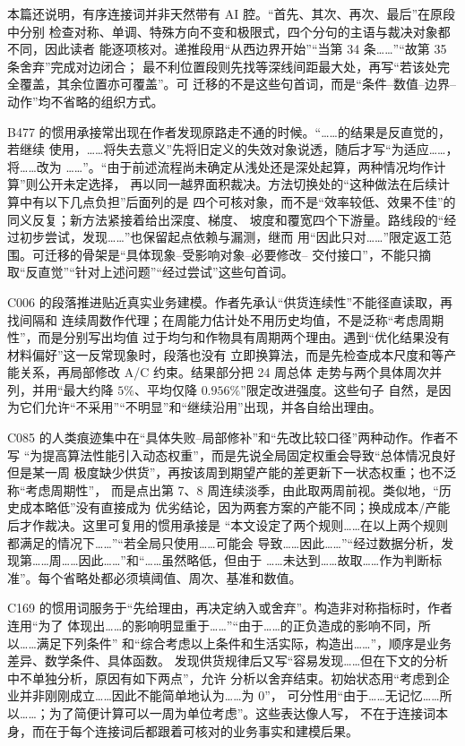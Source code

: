 本篇还说明，有序连接词并非天然带有 AI 腔。“首先、其次、再次、最后”在原段中分别
检查对称、单调、特殊方向不变和极限式，四个分句的主语与裁决对象都不同，因此读者
能逐项核对。递推段用“从西边界开始”“当第 34 条……”“故第 35 条舍弃”完成对边闭合；
最不利位置段则先找等深线间距最大处，再写“若该处完全覆盖，其余位置亦可覆盖”。可
迁移的不是这些句首词，而是“条件--数值--边界--动作”均不省略的组织方式。

B477 的惯用承接常出现在作者发现原路走不通的时候。“……的结果是反直觉的，若继续
使用，……将失去意义”先将旧定义的失效对象说透，随后才写“为适应……，将……改为
……”。“由于前述流程尚未确定从浅处还是深处起算，两种情况均作计算”则公开未定选择，
再以同一越界面积裁决。方法切换处的“这种做法在后续计算中有以下几点负担”后面列的是
四个可核对象，而不是“效率较低、效果不佳”的同义反复；新方法紧接着给出深度、梯度、
坡度和覆宽四个下游量。路线段的“经过初步尝试，发现……”也保留起点依赖与漏测，继而
用“因此只对……”限定返工范围。可迁移的骨架是“具体现象--受影响对象--必要修改--
交付接口”，不能只摘取“反直觉”“针对上述问题”“经过尝试”这些句首词。

C006 的段落推进贴近真实业务建模。作者先承认“供货连续性”不能径直读取，再找间隔和
连续周数作代理；在周能力估计处不用历史均值，不是泛称“考虑周期性”，而是分别写出均值
过于均匀和作物具有周期两个理由。遇到“优化结果没有材料偏好”这一反常现象时，段落也没有
立即换算法，而是先检查成本尺度和等产能关系，再局部修改 A/C 约束。结果部分把 24 周总体
走势与两个具体周次并列，并用“最大约降 $5\%$、平均仅降 $0.956\%$”限定改进强度。这些句子
自然，是因为它们允许“不采用”“不明显”和“继续沿用”出现，并各自给出理由。

C085 的人类痕迹集中在“具体失败--局部修补”和“先改比较口径”两种动作。作者不写
“为提高算法性能引入动态权重”，而是先说全局固定权重会导致“总体情况良好但是某一周
极度缺少供货”，再按该周到期望产能的差更新下一状态权重；也不泛称“考虑周期性”，
而是点出第 7、8 周连续淡季，由此取两周前视。类似地，“历史成本略低”没有直接成为
优劣结论，因为两套方案的产能不同；换成成本/产能后才作裁决。这里可复用的惯用承接是
“本文设定了两个规则……在以上两个规则都满足的情况下……”“若全局只使用……可能会
导致……因此……”“经过数据分析，发现第……周……因此……”和“……虽然略低，但由于
……未达到……故取……作为判断标准”。每个省略处都必须填阈值、周次、基准和数值。

C169 的惯用词服务于“先给理由，再决定纳入或舍弃”。构造非对称指标时，作者连用“为了
体现出……的影响明显重于……”“由于……的正负造成的影响不同，所以……满足下列条件”
和“综合考虑以上条件和生活实际，构造出……”，顺序是业务差异、数学条件、具体函数。
发现供货规律后又写“容易发现……但在下文的分析中不单独分析，原因有如下两点”，允许
分析以舍弃结束。初始状态用“考虑到企业并非刚刚成立……因此不能简单地认为……为 0”，
可分性用“由于……无记忆……所以……；为了简便计算可以一周为单位考虑”。这些表达像人写，
不在于连接词本身，而在于每个连接词后都跟着可核对的业务事实和建模后果。

